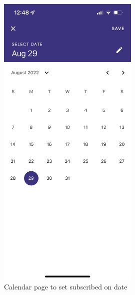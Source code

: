 \documentclass[11pt]{article}
\begin{document}
\begin{figure}[h!]
    \centering
    \begin{minipage}[c]{0.45\textwidth}
        \centering
        \includegraphics[width=0.6\textwidth, clip]{../../assets/smartphone/calendar.PNG}
        \caption{Calendar page to set subscribed on date}
        \label{fig:calendar}
    \end{minipage}\hspace{1cm}%
    \begin{minipage}[c]{0.45\textwidth}
        \centering

\end{minipage}
\end{figure}
\end{document}
